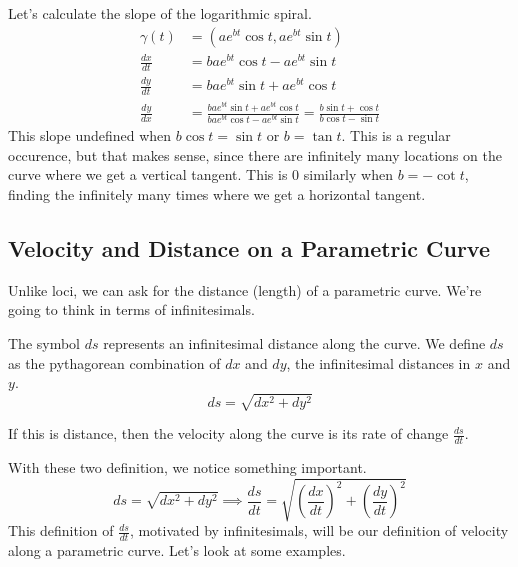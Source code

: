 \documentclass[fleqn]{report}
\begin{document}
\begin{example}
Let's calculate the slope of the logarithmic spiral. 
\begin{align*}
\gamma(t) & = (ae^{bt} \cos t, ae^{bt} \sin t) \\
\frac{dx}{dt} & = bae^{bt} \cos t - a e^{bt} \sin t \\
\frac{dy}{dt} & = bae^{bt} \sin t + ae^{bt} \cos t \\
\frac{dy}{dx} & = \frac{bae^{bt} \sin t + ae^{bt} \cos t} {
bae^{bt} \cos t - a e^{bt} \sin t} = \frac{b\sin t + \cos t}{b
\cos t - \sin t}
\end{align*}
This slope undefined when $b \cos t = \sin t$ or $b = \tan
t$. This is a regular occurence, but that makes sense, since
there are infinitely many locations on the curve where
we get a vertical tangent. This is $0$ similarly when $b =
-\cot t$, finding the infinitely many times where we get a
horizontal tangent. 
\end{example}

\subsection{Velocity and Distance on a Parametric Curve}
\label{velocity-distance}

Unlike loci, we can ask for the distance (length) of a
parametric curve. We're going to think in terms of
infinitesimals. 

\begin{defn}
The symbol $ds$ represents an infinitesimal distance along
the curve. We define $ds$ as the pythagorean combination of
$dx$ and $dy$, the infinitesimal distances in $x$ and $y$.
\begin{equation*}
ds = \sqrt{dx^2 + dy^2}
\end{equation*} 
\end{defn}

\begin{defn}
If this is distance, then the velocity along the curve is
its rate of change $\frac{ds}{dt}$. 
\end{defn}

With these two definition, we notice something important.
\begin{equation*}
ds = \sqrt{dx^2 + dy^2} \implies \frac{ds}{dt} = \sqrt{
\left( \frac{dx}{dt} \right)^2 + \left( \frac{dy}{dt}
\right)^2 }
\end{equation*}
This definition of $\frac{ds}{dt}$, motivated by
infinitesimals, will be our definition of velocity along a
parametric curve. Let's look at some examples.
\end{document}
